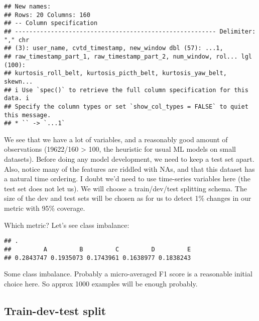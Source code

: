 \documentclass[
]{article}
\newenvironment{Shaded}{\begin{snugshade}}{\end{snugshade}}
\newcommand{\FunctionTok}[1]{\textcolor[rgb]{0.00,0.00,0.00}{#1}}
\newcommand{\NormalTok}[1]{#1}
\newcommand{\SpecialCharTok}[1]{\textcolor[rgb]{0.00,0.00,0.00}{#1}}
\begin{document}
\begin{verbatim}
## New names:
## Rows: 20 Columns: 160
## -- Column specification
## -------------------------------------------------------- Delimiter: "," chr
## (3): user_name, cvtd_timestamp, new_window dbl (57): ...1,
## raw_timestamp_part_1, raw_timestamp_part_2, num_window, rol... lgl (100):
## kurtosis_roll_belt, kurtosis_picth_belt, kurtosis_yaw_belt, skewn...
## i Use `spec()` to retrieve the full column specification for this data. i
## Specify the column types or set `show_col_types = FALSE` to quiet this message.
## * `` -> `...1`
\end{verbatim}

We see that we have a lot of variables, and a reasonably good amount of
observations (19622/160 \textgreater{} 100, the heuristic for usual ML
models on small datasets). Before doing any model development, we need
to keep a test set apart. Also, notice many of the features are riddled
with NAs, and that this dataset has a natural time ordering. I doubt
we'd need to use time-series variables here (the test set does not let
us). We will choose a train/dev/test splitting schema. The size of the
dev and test sets will be chosen as for us to detect 1\% changes in our
metric with 95\% coverage.

Which metric? Let's see class imbalance:

\begin{Shaded}
\end{Shaded}

\begin{verbatim}
## .
##         A         B         C         D         E 
## 0.2843747 0.1935073 0.1743961 0.1638977 0.1838243
\end{verbatim}

Some class imbalance. Probably a micro-averaged F1 score is a reasonable
initial choice here. So approx 1000 examples will be enough probably.

\hypertarget{train-dev-test-split}{%
\subsection{Train-dev-test split}\label{train-dev-test-split}}
\end{document}
